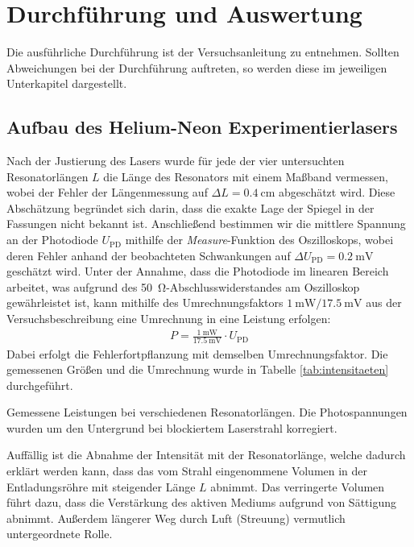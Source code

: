\documentclass[11pt, a4paper]{article}
\numberwithin{equation}{section}
\begin{document}
\section{Durchführung und Auswertung}
Die ausführliche Durchführung ist der Versuchsanleitung \cite{anleitung} zu entnehmen.
Sollten Abweichungen bei der Durchführung auftreten, so werden diese im jeweiligen Unterkapitel dargestellt.

\subsection{Aufbau des Helium-Neon Experimentierlasers}
Nach der Justierung des Lasers wurde für jede der vier untersuchten Resonatorlängen $L$ die Länge des Resonators mit einem Maßband vermessen, wobei der Fehler der Längenmessung auf $\Delta L = \SI{0.4}{\centi\metre}$ abgeschätzt wird.
Diese Abschätzung begründet sich darin, dass die exakte Lage der Spiegel in der Fassungen nicht bekannt ist.
Anschließend bestimmen wir die mittlere Spannung an der Photodiode $U_\mathrm{PD}$ mithilfe der \textit{Measure}-Funktion des Oszilloskops, wobei deren Fehler anhand der beobachteten Schwankungen auf $\Delta U_\mathrm{PD} = \SI{0.2}{\milli\volt}$ geschätzt wird.
Unter der Annahme, dass die Photodiode im linearen Bereich arbeitet, was aufgrund des \SI{50}{\ohm}-Abschlusswiderstandes am Oszilloskop gewährleistet ist, kann mithilfe des Umrechnungsfaktors $\SI{1}{\milli\watt} / \SI{17.5}{\milli\volt}$ aus der Versuchsbeschreibung \cite{anleitung} eine Umrechnung in eine Leistung erfolgen:
\begin{align}
	P = \frac{\SI{1}{\milli\watt}}{\SI{17.5}{\milli\volt}} \cdot U_\mathrm{PD}
	\label{eq:umrechnung_watt}
\end{align}
Dabei erfolgt die Fehlerfortpflanzung mit demselben Umrechnungsfaktor.
Die gemessenen Größen und die Umrechnung wurde in Tabelle \ref{tab:intensitaeten} durchgeführt.
\begin{table}[h]
	\centering
	
	\caption{Gemessene Leistungen bei verschiedenen Resonatorlängen. Die Photospannungen wurden um den Untergrund bei blockiertem Laserstrahl korregiert.}
	\label{tab:intensitaeten}
\end{table}
Auffällig ist die Abnahme der Intensität mit der Resonatorlänge, welche dadurch erklärt werden kann, dass das vom Strahl eingenommene Volumen in der Entladungsröhre mit steigender Länge $L$ abnimmt.
Das verringerte Volumen führt dazu, dass die Verstärkung des aktiven Mediums aufgrund von Sättigung abnimmt.
Außerdem längerer Weg durch Luft (Streuung) vermutlich untergeordnete Rolle.
\end{document}
